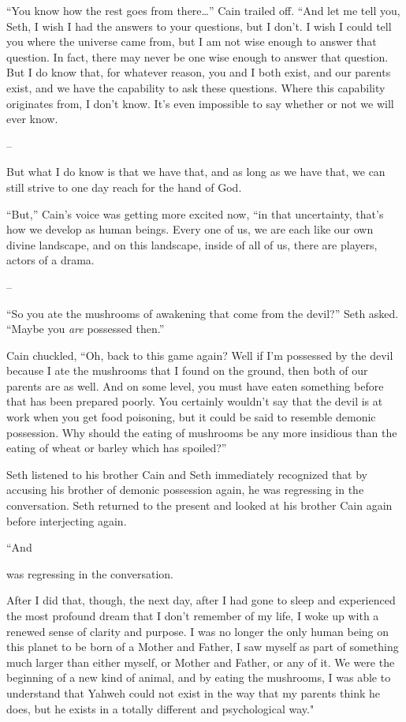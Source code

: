 \documentclass[12pt,twoside,titlepage]{report}
\begin{document}
``You know how the rest goes from there\ldots{}'' Cain trailed off.
``And let me tell you, Seth, I wish I had the answers to your questions,
but I don't. I wish I could tell you where the universe came from, but I
am not wise enough to answer that question. In fact, there may never be
one wise enough to answer that question. But I do know that, for
whatever reason, you and I both exist, and our parents exist, and we
have the capability to ask these questions. Where this capability
originates from, I don't know. It's even impossible to say whether or
not we will ever know.

--

But what I do know is that we have that, and as long as we have that, we
can still strive to one day reach for the hand of God.

``But,'' Cain's voice was getting more excited now, ``in that
uncertainty, that's how we develop as human beings. Every one of us, we
are each like our own divine landscape, and on this landscape, inside of
all of us, there are players, actors of a drama.

--

``So you ate the mushrooms of awakening that come from the devil?'' Seth
asked. ``Maybe you \emph{are} possessed then.''

Cain chuckled, ``Oh, back to this game again? Well if I'm possessed by
the devil because I ate the mushrooms that I found on the ground, then
both of our parents are as well. And on some level, you must have eaten
something before that has been prepared poorly. You certainly wouldn't
say that the devil is at work when you get food poisoning, but it could
be said to resemble demonic possession. Why should the eating of
mushrooms be any more insidious than the eating of wheat or barley which
has spoiled?''

Seth listened to his brother Cain and Seth immediately recognized that
by accusing his brother of demonic possession again, he was regressing
in the conversation. Seth returned to the present and looked at his
brother Cain again before interjecting again.

``And

was regressing in the conversation.

After I did that, though, the next day, after I had gone to sleep and
experienced the most profound dream that I don't remember of my life, I
woke up with a renewed sense of clarity and purpose. I was no longer the
only human being on this planet to be born of a Mother and Father, I saw
myself as part of something much larger than either myself, or Mother
and Father, or any of it. We were the beginning of a new kind of animal,
and by eating the mushrooms, I was able to understand that Yahweh could
not exist in the way that my parents think he does, but he exists in a
totally different and psychological way."
\end{document}
